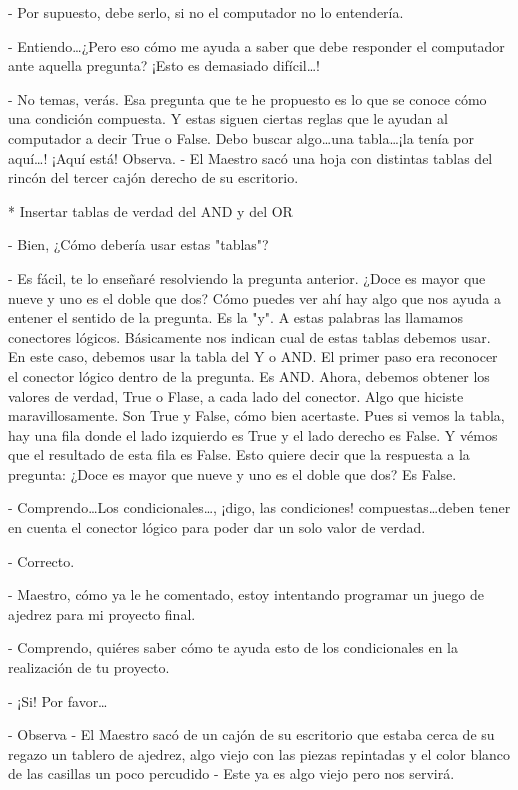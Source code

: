 \documentclass[12pt, letterpaper]{article}
\begin{document}
- Por supuesto, debe serlo, si no el computador no lo entendería. 

- Entiendo\dots ¿Pero eso cómo me ayuda a saber que debe responder el computador ante aquella pregunta? ¡Esto es demasiado difícil\dots!

- No temas, verás. Esa pregunta que te he propuesto es lo que se conoce cómo una condición compuesta. Y estas siguen ciertas reglas que le ayudan al
computador a decir True o False. Debo buscar algo\dots una tabla\dots ¡la tenía por aquí\dots! ¡Aquí está! Observa. - El Maestro sacó una hoja con distintas
tablas del rincón del tercer cajón derecho de su escritorio.

* Insertar tablas de verdad del AND y del OR

- Bien, ¿Cómo debería usar estas "tablas"?

- Es fácil, te lo enseñaré resolviendo la pregunta anterior. ¿Doce es mayor que nueve y uno es el doble que dos?
Cómo puedes ver ahí hay algo que nos ayuda a entener el sentido de la pregunta. Es la "y".
A estas palabras las llamamos conectores lógicos. Básicamente nos indican cual de estas tablas debemos usar. 
En este caso, debemos usar la tabla del Y o AND. El primer paso era reconocer el conector lógico dentro de la 
pregunta. Es AND. Ahora, debemos obtener los valores de verdad, True o Flase, a cada lado del conector. Algo
que hiciste maravillosamente. Son True y False, cómo bien acertaste. Pues si vemos la tabla, hay una fila donde 
el lado izquierdo es True y el lado derecho es False. Y vémos que el resultado de esta fila es False. Esto quiere
decir que la respuesta a la pregunta: ¿Doce es mayor que nueve y uno es el doble que dos? Es False. 

- Comprendo\dots Los condicionales\dots, ¡digo, las condiciones! compuestas\dots deben tener en cuenta el conector lógico
para poder dar un solo valor de verdad. 

- Correcto. 

- Maestro, cómo ya le he comentado, estoy intentando programar un juego de ajedrez para mi proyecto final.

- Comprendo, quiéres saber cómo te ayuda esto de los condicionales en la realización de tu proyecto.

- ¡Si! Por favor\dots

- Observa - El Maestro sacó de un cajón de su escritorio que estaba cerca de su regazo un tablero de ajedrez,
algo viejo con las piezas repintadas y el color blanco de las casillas un poco percudido - Este ya es algo viejo
pero nos servirá. 
\end{document}
